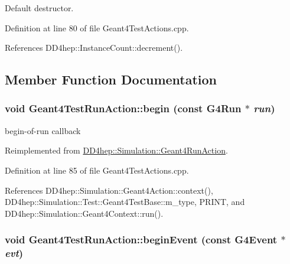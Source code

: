 Default destructor. 

Definition at line 80 of file Geant4TestActions.cpp.

References DD4hep::InstanceCount::decrement().

\subsection{Member Function Documentation}
\hypertarget{class_d_d4hep_1_1_simulation_1_1_test_1_1_geant4_test_run_action_a1df121c6a80d42e72c898e7303d5c64e}{
\subsubsection[{begin}]{\setlength{\rightskip}{0pt plus 5cm}void Geant4TestRunAction::begin (const G4Run $\ast$ {\em run})}}
\label{class_d_d4hep_1_1_simulation_1_1_test_1_1_geant4_test_run_action_a1df121c6a80d42e72c898e7303d5c64e}


begin-\/of-\/run callback 

Reimplemented from \hyperlink{class_d_d4hep_1_1_simulation_1_1_geant4_run_action_aeea4684e5d27e039b26734c3dbf3f65b}{DD4hep::Simulation::Geant4RunAction}.

Definition at line 85 of file Geant4TestActions.cpp.

References DD4hep::Simulation::Geant4Action::context(), DD4hep::Simulation::Test::Geant4TestBase::m\_\-type, PRINT, and DD4hep::Simulation::Geant4Context::run().\hypertarget{class_d_d4hep_1_1_simulation_1_1_test_1_1_geant4_test_run_action_af1b4e87826ebabd5a73c9fc4a1f853d5}{
\subsubsection[{beginEvent}]{\setlength{\rightskip}{0pt plus 5cm}void Geant4TestRunAction::beginEvent (const G4Event $\ast$ {\em evt})}}
\label{class_d_d4hep_1_1_simulation_1_1_test_1_1_geant4_test_run_action_af1b4e87826ebabd5a73c9fc4a1f853d5}


